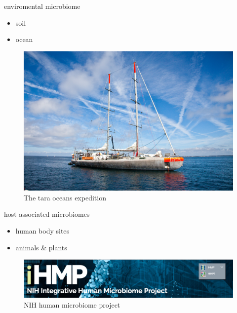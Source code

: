 \documentclass[ignorenonframetext,]{beamer}
\providecommand{\tightlist}{%
  \setlength{\itemsep}{0pt}\setlength{\parskip}{0pt}}
\begin{document}
\begin{frame}{enviromental microbiome}
\protect\hypertarget{enviromental-microbiome}{}
\begin{itemize}
\tightlist
\item
  soil
\item
  ocean
\end{itemize}

\begin{figure}
\centering
\includegraphics[width=\textwidth,height=0.5\textheight]{images/talk06/tara_oceans_boat.jpg}
\caption{The tara oceans expedition}
\end{figure}
\end{frame}

\begin{frame}{host associated microbiomes}
\protect\hypertarget{host-associated-microbiomes}{}
\begin{itemize}
\tightlist
\item
  human body sites
\item
  animals \& plants
\end{itemize}

\begin{figure}
\centering
\includegraphics[width=\textwidth,height=0.3\textheight]{images/talk06/iHMP.png}
\caption{NIH human microbiome project}
\end{figure}
\end{frame}
\end{document}
